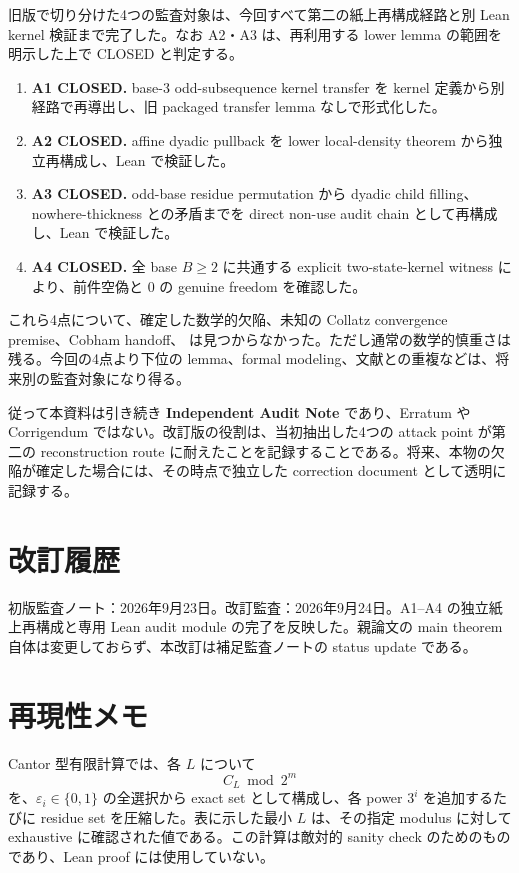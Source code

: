 \documentclass[a4paper,11pt]{ltjsarticle}
\newcommand{\code}[1]{\path{#1}}
\begin{document}
旧版で切り分けた4つの監査対象は、今回すべて第二の紙上再構成経路と別 Lean kernel 検証まで完了した。なお A2・A3 は、再利用する lower lemma の範囲を明示した上で CLOSED と判定する。
\begin{enumerate}[label=\arabic*.]
\item \textbf{A1 CLOSED.} base-3 odd-subsequence kernel transfer を kernel 定義から別経路で再導出し、旧 packaged transfer lemma なしで形式化した。
\item \textbf{A2 CLOSED.} affine dyadic pullback を lower local-density theorem から独立再構成し、Lean で検証した。
\item \textbf{A3 CLOSED.} odd-base residue permutation から dyadic child filling、nowhere-thickness との矛盾までを direct non-use audit chain として再構成し、Lean で検証した。
\item \textbf{A4 CLOSED.} 全 base $B\ge2$ に共通する explicit two-state-kernel witness により、前件空偽と $0$ の genuine freedom を確認した。
\end{enumerate}

これら4点について、確定した数学的欠陥、未知の Collatz convergence premise、Cobham handoff、\code{sorryAx} は見つからなかった。ただし通常の数学的慎重さは残る。今回の4点より下位の lemma、formal modeling、文献との重複などは、将来別の監査対象になり得る。

従って本資料は引き続き \textbf{Independent Audit Note} であり、Erratum や Corrigendum ではない。改訂版の役割は、当初抽出した4つの attack point が第二の reconstruction route に耐えたことを記録することである。将来、本物の欠陥が確定した場合には、その時点で独立した correction document として透明に記録する。
\section*{改訂履歴}
初版監査ノート：2026年9月23日。改訂監査：2026年9月24日。A1--A4 の独立紙上再構成と専用 Lean audit module の完了を反映した。親論文の main theorem 自体は変更しておらず、本改訂は補足監査ノートの status update である。

\section*{再現性メモ}

Cantor 型有限計算では、各 $L$ について
\[
C_L\bmod 2^m
\]
を、$\varepsilon_i\in\{0,1\}$ の全選択から exact set として構成し、各 power $3^i$ を追加するたびに residue set を圧縮した。表に示した最小 $L$ は、その指定 modulus に対して exhaustive に確認された値である。この計算は敵対的 sanity check のためのものであり、Lean proof には使用していない。
\end{document}
